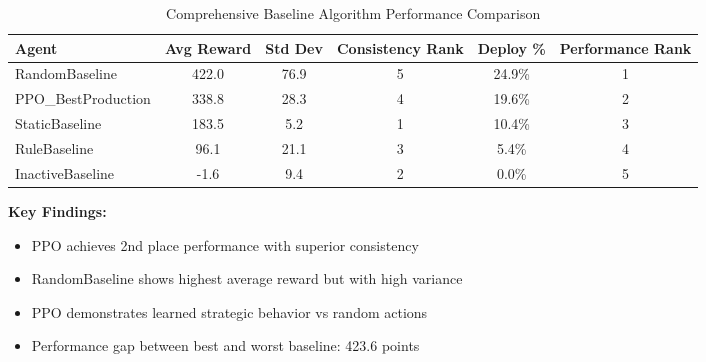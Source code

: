 \begin{table}[H]
\centering
\caption{Comprehensive Baseline Algorithm Performance Comparison}
\label{tab:baseline_comparison}
\begin{tabular}{|l|c|c|c|c|c|}
\hline
\textbf{Agent} & \textbf{Avg Reward} & \textbf{Std Dev} & \textbf{Consistency Rank} & \textbf{Deploy \%} & \textbf{Performance Rank} \\
\hline
RandomBaseline & 422.0 & 76.9 & 5 & 24.9\% & 1 \\
PPO\_BestProduction & 338.8 & 28.3 & 4 & 19.6\% & 2 \\
StaticBaseline & 183.5 & 5.2 & 1 & 10.4\% & 3 \\
RuleBaseline & 96.1 & 21.1 & 3 & 5.4\% & 4 \\
InactiveBaseline & -1.6 & 9.4 & 2 & 0.0\% & 5 \\
\hline
\end{tabular}
\end{table}

\textbf{Key Findings:}
\begin{itemize}
\item PPO achieves 2nd place performance with superior consistency
\item RandomBaseline shows highest average reward but with high variance
\item PPO demonstrates learned strategic behavior vs random actions
\item Performance gap between best and worst baseline: 423.6 points
\end{itemize}
